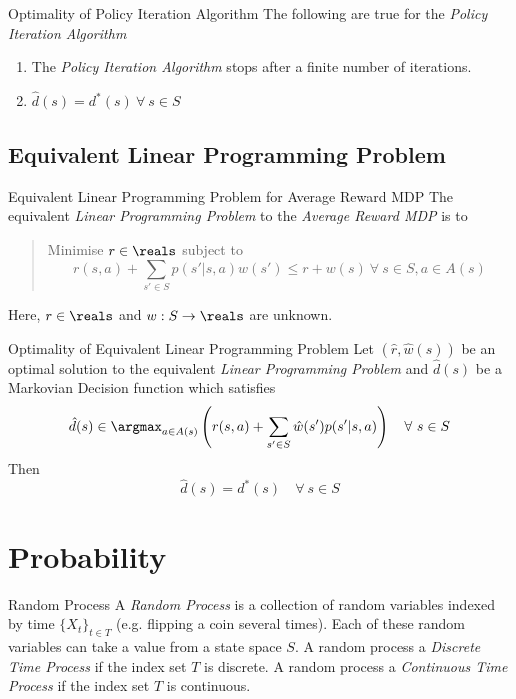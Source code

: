 \documentclass[11pt,a4paper]{article}
\begin{document}
  \begin{theorem}{Optimality of Policy Iteration Algorithm}
    The following are true for the \textit{Policy Iteration Algorithm}
    \begin{enumerate}
      \item The \textit{Policy Iteration Algorithm} stops after a finite number of iterations.
      \item $\hat{d}(s)=d^*(s)\ \forall\ s\in S$
    \end{enumerate}
  \end{theorem}

\subsection*{Equivalent Linear Programming Problem}

  \begin{proposition}{Equivalent Linear Programming Problem for Average Reward MDP}
    The equivalent \textit{Linear Programming Problem} to the \textit{Average Reward MDP} is to
    \begin{quote}
      Minimise $r\in\reals$ subject to
      \[ r(s,a)+\sum_{s'\in S}p(s'|s,a)w(s')\leq r+w(s)\ \forall\ s\in S,a\in A(s) \]
    \end{quote}
    Here, $r\in\reals$ and $w:S\to\reals$ are unknown.
  \end{proposition}

  \begin{theorem}{Optimality of Equivalent Linear Programming Problem}
    Let $(\hat{r},\hat{w}(s))$ be an optimal solution to the equivalent \textit{Linear Programming Problem} and $\hat{d}(s)$ be a Markovian Decision function which satisfies
    \[ \hat{d}(s)\in\argmax_{a\in A(s)}\left(r(s,a)+\sum_{s'\in S}\hat{w}(s')p(s'|s,a)\right)\quad\forall\ s\in S \]
    Then
    \[ \hat{d}(s)=d^*(s)\quad\forall\ s\in S \]
  \end{theorem}

\section{Probability}

  \begin{definition}{Random Process}
    A \textit{Random Process} is a collection of random variables indexed by time $\{X_t\}_{t\in T}$ (e.g. flipping a coin several times). Each of these random variables can take a value from a state space $S$. A random process a \textit{Discrete Time Process} if the index set $T$ is discrete. A random process a \textit{Continuous Time Process} if the index set $T$ is continuous.
  \end{definition}
\end{document}
